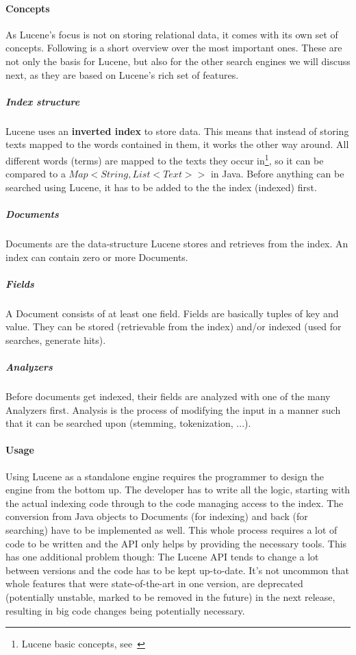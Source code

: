 \paragraph{Concepts}

As Lucene's focus is not on storing relational data, it comes with its own set of concepts. Following is a short overview over the most important ones. These are not only the basis for Lucene, but also for the other search engines we will discuss next, as they are based on Lucene's rich set of features.

\subparagraph{Index structure}
Lucene uses an \textbf{inverted index} to store data. This means that instead of storing texts mapped to the words contained in them, it works the other way around. All different words (terms) are mapped to the texts they occur in\footnote{Lucene basic concepts, see~\cite{lucene_basic_concepts}}, so it can be compared to a \(Map<String, List<Text>>\) in Java. Before anything can be searched using Lucene, it has to be added to the the index (indexed) first.

\subparagraph{Documents}
Documents are the data-structure Lucene stores and retrieves from the index. An index can contain zero or more Documents.

\subparagraph{Fields}
A Document consists of at least one field. Fields are basically tuples of key and value. They can be stored (retrievable from the index) and/or indexed (used for searches, generate hits).

\subparagraph{Analyzers}
Before documents get indexed, their fields are analyzed with one of the many Analyzers first. Analysis is the process of modifying the input in a manner such that it can be searched upon (stemming, tokenization, ...).

\paragraph{Usage}
Using Lucene as a standalone engine requires the programmer to design the engine from the bottom up. The developer has to write all the logic, starting with the actual indexing code through to the code managing access to the index. The conversion from Java objects to Documents (for indexing) and back (for searching) have to be implemented as well. This whole process requires a lot of code to be written and the API only helps by providing the necessary tools. This has one additional problem though: The Lucene API tends to change a lot between versions and the code has to be kept up-to-date. It's not uncommon that whole features that were state-of-the-art in one version, are deprecated (potentially unstable, marked to be removed in the future) in the next release, resulting in big code changes being potentially necessary.

